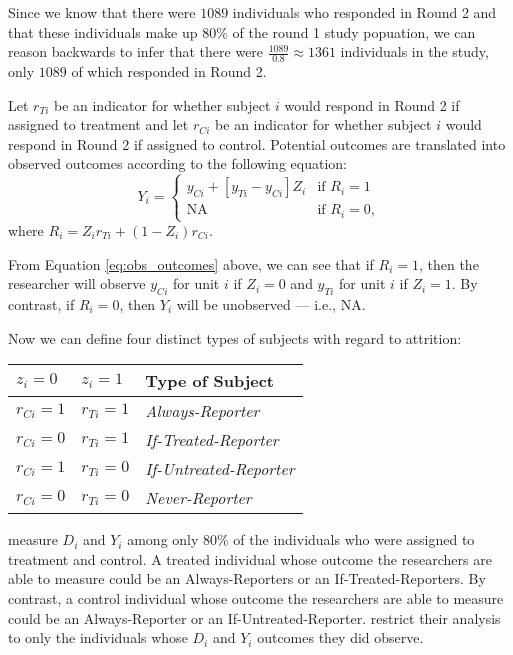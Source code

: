 \documentclass[
  12pt,
  leqno]{article}
\DeclareMathOperator{\1}{\mathbbm{1}}
\begin{document}
Since we know that there were \(1089\) individuals who responded in
Round 2 and that these individuals make up 80\% of the round 1 study
popuation, we can reason backwards to infer that there were
\(\frac{1089}{0.8} \approx 1361\) individuals in the study, only
\(1089\) of which responded in Round 2.

Let \(r_{Ti}\) be an indicator for whether subject \(i\) would respond
in Round 2 if assigned to treatment and let \(r_{Ci}\) be an indicator
for whether subject \(i\) would respond in Round 2 if assigned to
control. Potential outcomes are translated into observed outcomes
according to the following equation: \begin{equation}
\label{eq:obs_outcomes}
Y_i = \begin{cases} y_{Ci} + [y_{Ti} - y_{Ci}] Z_i & \text{if } R_i = 1 \\
\text{NA} & \text{if } R_i = 0, \end{cases}
\end{equation} where \(R_i = Z_i r_{Ti} + \left(1 - Z_i\right) r_{Ci}\).

From Equation \ref{eq:obs_outcomes} above, we can see that if
\(R_i = 1\), then the researcher will observe \(y_{Ci}\) for unit \(i\)
if \(Z_i = 0\) and \(y_{Ti}\) for unit \(i\) if \(Z_i = 1\). By
contrast, if \(R_i = 0\), then \(Y_i\) will be unobserved --- i.e., NA.

Now we can define four distinct types of subjects with regard to
attrition:

\begin{table}[h]
\centering
    \begin{tabular}{lll}
    \toprule
    $z_i = 0$ & $z_i = 1$ & Type of Subject       \\
    \midrule
    $r_{Ci} = 1$ & $r_{Ti} = 1$ & \textit{Always-Reporter} \\
    $r_{Ci} = 0$ & $r_{Ti} = 1$ & \textit{If-Treated-Reporter} \\
    $r_{Ci} = 1$ & $r_{Ti} = 0$ & \textit{If-Untreated-Reporter} \\
    $r_{Ci} = 0$ & $r_{Ti} = 0$ & \textit{Never-Reporter} \\
    \bottomrule
    \end{tabular}
\end{table}

\citet{albertsonlawrence2009} measure \(D_i\) and \(Y_i\) among only
80\% of the individuals who were assigned to treatment and control. A
treated individual whose outcome the researchers are able to measure
could be an Always-Reporters or an If-Treated-Reporters. By contrast, a
control individual whose outcome the researchers are able to measure
could be an Always-Reporter or an If-Untreated-Reporter.
\citet{albertsonlawrence2009} restrict their analysis to only the
individuals whose \(D_i\) and \(Y_i\) outcomes they did observe.
\end{document}
